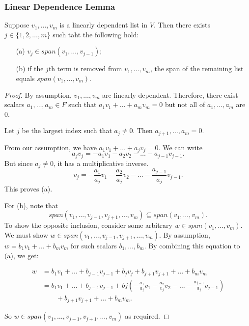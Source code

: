 \documentclass[11pt]{article}
\begin{document}
    \subsubsection{Linear Dependence Lemma}

    Suppose \(v_1, \dots, v_m\) is a linearly dependent list in $V$. Then there exists \(j \in \{1,2,\dots,m\}\) such taht the following hold:
    \begin{enumerate}
        \item[(a)] \(v_j \in span(v_1, \dots, v_{j-1});\)
        \item[(b)] if the $j$th term is removed from \(v_1, \dots, v_m\), the span of the remaining list equals \(span(v_1, \dots, v_m)\).   
    \end{enumerate}

    \begin{proof}
        By assumption, \(v_1, \dots, v_m\) are linearly dependent. Therefore, there exist scalars \(a_1, \dots, a_m \in F\) such that \(a_1 v_1 + \dots + a_m v_m = 0\) but not all of \(a_1, \dots, a_m\) are 0.

        Let $j$ be the largest index such that \(a_j \neq 0\). Then \(a_{j+1}, \dots, a_m = 0.\) 

        From our assumption, we have \(a_1 v_1 + \dots + a_j v_j = 0.\) We can write \[a_j v_j = -a_1 v_1 - a_2 v_2 - \dots - a_{j-1} v_{j-1}.\] But since \(a_j \neq 0\), it has a multiplicative inverse. \[v_j = - \frac{a_1}{a_j} v_1 - \frac{a_2}{a_j} v_2 - \dots - \frac{a_{j-1}}{a_j} v_{j-1}.\] This proves (a).

        For (b), note that \[span(v_1, \dots, v_{j-1}, v_{j+1}, \dots, v_m) \subseteq span(v_1, \dots, v_m).\] To show the opposite inclusion, consider some arbitrary \(w \in span(v_1, \dots, v_m).\) We must show \(w \in span(v_1, \dots, v_{j-1}, v_{j+1}, \dots, v_m).\) By assumption, \(w = b_1 v_1 + \dots + b_m v_m\) for such scalars \(b_1, \dots, b_m\). By combining this equation to (a), we get:

        \begin{align*}
            w &= b_1 v_1 + \dots + b_{j-1} v_{j-1} + b_j v_j + b_{j+1} v_{j+1} + \dots + b_m v_m \\
            &= b_1 v_1 + \dots + b_{j-1} v_{j-1} + bj \left( - \frac{a_1}{a_j} v_1 - \frac{a_2}{v_j} v_2 - \dots - \frac{a_{j-1}}{a_j} v_{j-1} \right) \\
            & \qquad + b_{j+1} v_{j+1} + \dots + b_m v_m.
        \end{align*}

        So \(w \in span(v_1, \dots, v_{j-1}, v_{j+1}, \dots, v_m)\) as required.
    \end{proof}
\end{document}
